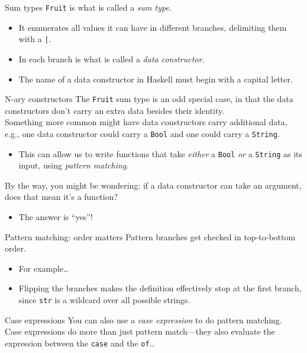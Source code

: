 \documentclass[presentation]{beamer}
\begin{document}
\begin{frame}[label={sec:orgb0b6e26},fragile]{Sum types}
 \texttt{Fruit} is what is called a \emph{sum type}.
\pause
\begin{itemize}[<+->]
\item It enumerates all values it can have in different branches, delimiting them
with a \texttt{|}.
\item In each branch is what is called a \emph{data constructor}.
\item The name of a data constructor in Haskell must begin with a capital letter.
\end{itemize}
\end{frame}

\begin{frame}[label={sec:org083e2e8},fragile]{N-ary constructors}
 The \texttt{Fruit} sum type is an odd special case, in that the data constructors
don't carry an extra data besides their identity. \\[0pt]
\pause \bigskip
Something more common might have data constructors carry additional data,
e.g., one data constructor could carry a \texttt{Bool} and one could carry a \texttt{String}.
\pause
\begin{itemize}[<+->]
\item This can allow us to write functions that take \emph{either} a \texttt{Bool} \emph{or} a \texttt{String} as
its input, using \emph{pattern matching}.
\end{itemize}
\pause \bigskip
By the way, you might be wondering: if a data constructor can take an
argument, does that mean it's a function?
\pause
\begin{itemize}[<+->]
\item The answer is ``yes''!
\end{itemize}
\end{frame}

\begin{frame}[label={sec:org9cfe40e},fragile]{Pattern matching: order matters}
 Pattern branches get checked in top-to-bottom order.
\pause
\begin{itemize}[<+->]
\item For example\ldots{}
\item Flipping the branches makes the definition effectively stop at the first
branch, since \texttt{str} is a wildcard over all possible strings.
\end{itemize}
\end{frame}

\begin{frame}[label={sec:orgf1269f4},fragile]{Case expressions}
 You can also use a \emph{case expression} to do pattern matching. \\[0pt]
\pause \bigskip
Case expressions do more than just pattern match---they also evaluate the
expression between the \texttt{case} and the \texttt{of}\ldots{}
\end{frame}
\end{document}
